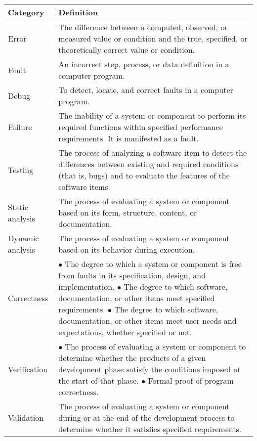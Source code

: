 \begin{tabular}{|p{1.3in}|p{4.7in}|}
{\bf Category}  &    {\bf Definition} \\ \hline \hline
Error    	&    The difference between a computed, observed, or measured value or
                     condition and the true, specified, or theoretically correct value 
                     or condition. \\ \hline
Fault    	&    An incorrect step, process, or data definition in a computer program. \\ \hline
Debug   	&    To detect, locate, and correct faults in a computer program. \\ \hline 
Failure  	&    The inability of a system or component to perform its required functions 
              	     within specified performance requirements.  It is manifested as a fault.  \\ \hline
Testing  	&    The process of analyzing a software item to detect the differences between 
              	     existing and required conditions (that is, bugs) and to evaluate the features 
                     of the software items. \\ \hline
Static analysis &    The process of evaluating a system or component based on its form,
                     structure, content, or documentation. \\ \hline
Dynamic analysis &   The process of evaluating a system or component based on its behavior
                     during execution. \\ \hline
Correctness 	&    $\bullet$ The degree to which a system or component is free from faults in its
                     specification, design, and implementation.  \newline
                     $\bullet$ The degree to which software, documentation, or other items meet
                     specified requirements.  \newline
                     $\bullet$ The degree to which software, documentation, or other items meet user
                     needs and expectations, whether specified or not. \\ \hline
Verification    &    $\bullet$ The process of evaluating a system or component to determine whether the
                     products of a given development phase satisfy the conditions imposed at
                     the start of that phase. \newline 
                     $\bullet$ Formal proof of program correctness. \\ \hline
Validation      &    The process of evaluating a system or component during or at the end of
                     the development process to determine whether it satisfies specified
                     requirements. \\ \hline
\end{tabular}










